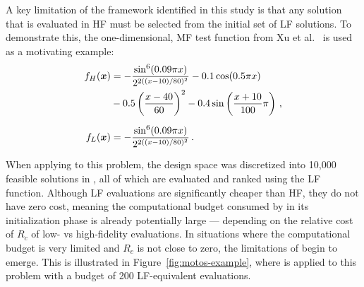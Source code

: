A key limitation of the \motos{} framework identified in this study is that any solution that is evaluated in HF must be selected from the initial set of LF solutions. To demonstrate this, the one-dimensional, MF test function from Xu et al.~\cite{xu2016mo2tos} is used as a motivating example:%
\begin{align}
f_H(\boldsymbol{x}) &= -\frac{\sin^6(0.09\pi x)}{2^{2((x-10)/80)^2}}-0.1\cos(0.5\pi x)\nonumber\\
           &-0.5\left(\frac{x-40}{60}\right)^2- 0.4\sin\left(\frac{x+10}{100}\pi\right)\,,\label{eq:hf-ex}\\[0.2cm]
f_L(\boldsymbol{x}) &= -\frac{\sin^6(0.09\pi x)}{2^{2((x-10)/80)^2}}\,. \label{eq:lf-ex}
\end{align}

When applying \motos{} to this problem, the design space was discretized into 10,000 feasible solutions in \cite{xu2016mo2tos}, all of which are evaluated and ranked using the LF function. Although LF evaluations are significantly cheaper than HF, they do not have zero cost, meaning the computational budget consumed by \motos{} in its initialization phase is already potentially large --- depending on the relative cost of $R_c$ of low- vs high-fidelity evaluations. In situations where the computational budget is very limited and $R_c$ is not close to zero, the limitations of \motos{} begin to emerge. This is illustrated in Figure~\ref{fig:motos-example}, where \motos{} is applied to this problem with a budget of 200 LF-equivalent evaluations. 


